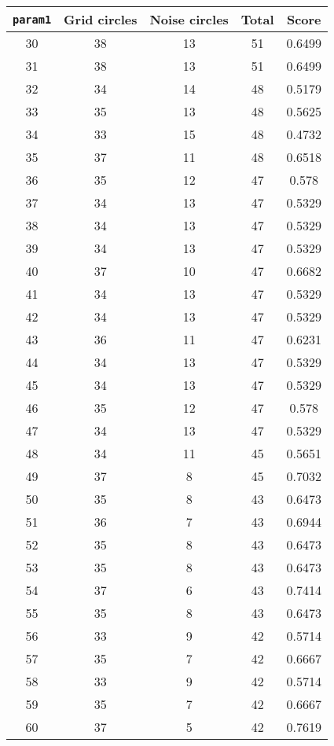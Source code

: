 \documentclass[letterpaper, 12pt]{article}
\begin{document}
\begin{longtable}{|c|c|c|c|c|}
\hline
\textbf{\texttt{param1}} & \textbf{Grid circles} & \textbf{Noise circles} & \textbf{Total} & \textbf{Score} \\
\hline
30 & 38 & 13 & 51 & 0.6499 \\
\hline
31 & 38 & 13 & 51 & 0.6499 \\
\hline
32 & 34 & 14 & 48 & 0.5179 \\
\hline
33 & 35 & 13 & 48 & 0.5625 \\
\hline
34 & 33 & 15 & 48 & 0.4732 \\
\hline
35 & 37 & 11 & 48 & 0.6518 \\
\hline
36 & 35 & 12 & 47 & 0.578 \\
\hline
37 & 34 & 13 & 47 & 0.5329 \\
\hline
38 & 34 & 13 & 47 & 0.5329 \\
\hline
39 & 34 & 13 & 47 & 0.5329 \\
\hline
40 & 37 & 10 & 47 & 0.6682 \\
\hline
41 & 34 & 13 & 47 & 0.5329 \\
\hline
42 & 34 & 13 & 47 & 0.5329 \\
\hline
43 & 36 & 11 & 47 & 0.6231 \\
\hline
44 & 34 & 13 & 47 & 0.5329 \\
\hline
45 & 34 & 13 & 47 & 0.5329 \\
\hline
46 & 35 & 12 & 47 & 0.578 \\
\hline
47 & 34 & 13 & 47 & 0.5329 \\
\hline
48 & 34 & 11 & 45 & 0.5651 \\
\hline
49 & 37 & 8 & 45 & 0.7032 \\
\hline
50 & 35 & 8 & 43 & 0.6473 \\
\hline
51 & 36 & 7 & 43 & 0.6944 \\
\hline
52 & 35 & 8 & 43 & 0.6473 \\
\hline
53 & 35 & 8 & 43 & 0.6473 \\
\hline
54 & 37 & 6 & 43 & 0.7414 \\
\hline
55 & 35 & 8 & 43 & 0.6473 \\
\hline
56 & 33 & 9 & 42 & 0.5714 \\
\hline
57 & 35 & 7 & 42 & 0.6667 \\
\hline
58 & 33 & 9 & 42 & 0.5714 \\
\hline
59 & 35 & 7 & 42 & 0.6667 \\
\hline
60 & 37 & 5 & 42 & 0.7619 \\

\end{longtable}
\end{document}
